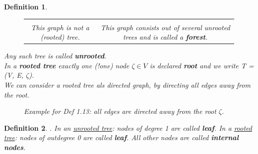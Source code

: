 \documentclass[10pt,a4paper]{article}
\newtheorem {defi}{Definition}[section]
\begin{document}
\begin{defi}
\begin{figure} [h!]
\begin{tabular}{c|c}
\begin{tikzpicture}
	\end{tikzpicture}
	\\
	This graph is not a (rooted) tree. 
	&
	This graph consists out of several unrooted trees and is called a \textbf{forest}. 	
	\end{tabular}
	\end{figure} 
	Any such tree is called \textbf{unrooted}. \\
	In a \textbf{rooted tree} exactly one (!one) node $\zeta \in V$ is declared \textbf{root} and we write T = (V, E, $\zeta$). \\
	We can consider a rooted tree als directed graph, by directing all edges away from the root. 	
	\begin{figure} [h!]
		\centering
		\caption{Example for Def 1.13: all edges are directed away from the root $\zeta$.}
	\end{figure}
\end{defi}
\begin{defi}.
	\newline
	In an \underline{unrooted tree}: nodes of degree 1 are called \textbf{leaf}. \newline
	In a \underline{rooted tree}: nodes of outdegree 0 are called \textbf{leaf}. \newline
	All other nodes are called \textbf{internal nodes}. 
\end{defi}
\end{document}
